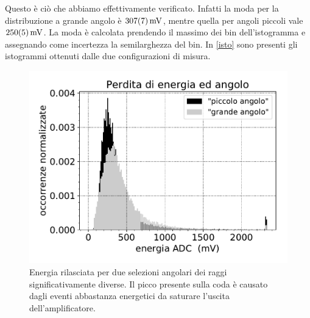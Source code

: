 Questo è ciò che abbiamo effettivamente verificato.
Infatti la moda per la distribuzione a grande angolo è $\SI{307\pm7}{mV}$,
mentre quella per angoli piccoli vale $\SI{250\pm5}{mV}$.
La moda è calcolata prendendo il massimo dei bin dell'istogramma e assegnando come incertezza la semilarghezza del bin.
In \autoref{isto} sono presenti gli istogrammi ottenuti dalle due configurazioni di misura.
\begin{figure}
\centering
\includegraphics[width=10 cm]{angoli}
\caption{Energia rilasciata per due selezioni angolari dei raggi significativamente diverse.
Il picco presente sulla coda è causato dagli eventi abbastanza energetici da saturare l'uscita dell'amplificatore.}
\label{isto}
\end{figure}
